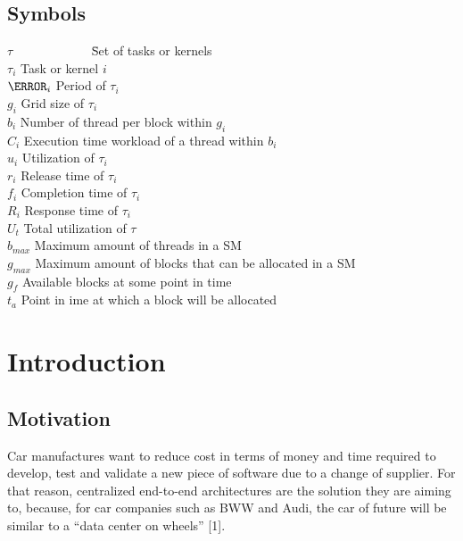 \documentclass[
  12pt,
  a4paperpaper,
]{report}
\begin{document}
\hypertarget{symbols}{%
\section*{Symbols}\label{symbols}}

\begin{tabbing}
$\tau$~~~~~~~~~~~~ \= Set of tasks or kernels \\
$\tau_i$ \> Task or kernel $i$\\
$\T_i$ \> Period of $\tau_i$ \\
$g_i$ \> Grid size of $\tau_i$ \\
$b_i$ \> Number of thread per block within $g_i$ \\
$C_i$ \> Execution time workload of a thread within $b_i$ \\
$u_i$ \> Utilization of $\tau_i$ \\
$r_i$ \> Release time of $\tau_i$ \\
$f_i$ \> Completion time of $\tau_i$ \\
$R_i$ \> Response time of $\tau_i$ \\
$U_t$ \> Total utilization of $\tau$ \\
$b_{max}$ \> Maximum amount of threads in a SM \\
$g_{max}$ \> Maximum amount of blocks that can be allocated in a SM \\
$g_f$ \> Available blocks at some point in time \\
$t_a$ \> Point in ime at which a block will be allocated \\
\end{tabbing}

\newpage
\setcounter{page}{1}
\renewcommand{\thepage}{\arabic{page}}

\hypertarget{introduction}{%
\chapter{Introduction}\label{introduction}}

\hypertarget{motivation}{%
\section{Motivation}\label{motivation}}

Car manufactures want to reduce cost in terms of money and time required
to develop, test and validate a new piece of software due to a change of
supplier. For that reason, centralized end-to-end architectures are the
solution they are aiming to, because, for car companies such as BWW and
Audi, the car of future will be similar to a ``data center on wheels''
{[}1{]}.
\end{document}
